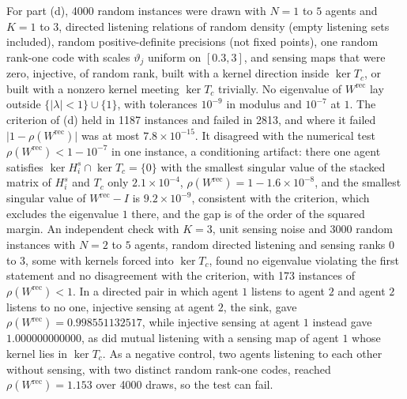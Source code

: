 \begin{numcheck}
For part (d), 4000 random instances were drawn with $N=1$ to $5$ agents and $K=1$ to $3$, directed listening relations of random density (empty listening sets included), random positive-definite precisions (not fixed points), one random rank-one code with scales $\vartheta_j$ uniform on $[0.3,3]$, and sensing maps that were zero, injective, of random rank, built with a kernel direction inside $\ker T_c$, or built with a nonzero kernel meeting $\ker T_c$ trivially. No eigenvalue of $W^{\mathrm{rec}}$ lay outside $\{\lvert\lambda\rvert<1\}\cup\{1\}$, with tolerances $10^{-9}$ in modulus and $10^{-7}$ at $1$. The criterion of (d) held in 1187 instances and failed in 2813, and where it failed $\lvert1-\rho(W^{\mathrm{rec}})\rvert$ was at most $7.8\times10^{-15}$. It disagreed with the numerical test $\rho(W^{\mathrm{rec}})<1-10^{-7}$ in one instance, a conditioning artifact: there one agent satisfies $\ker H^s_i\cap\ker T_c=\{0\}$ with the smallest singular value of the stacked matrix of $H^s_i$ and $T_c$ only $2.1\times10^{-4}$, $\rho(W^{\mathrm{rec}})=1-1.6\times10^{-8}$, and the smallest singular value of $W^{\mathrm{rec}}-I$ is $9.2\times10^{-9}$, consistent with the criterion, which excludes the eigenvalue $1$ there, and the gap is of the order of the squared margin. An independent check with $K=3$, unit sensing noise and 3000 random instances with $N=2$ to $5$ agents, random directed listening and sensing ranks $0$ to $3$, some with kernels forced into $\ker T_c$, found no eigenvalue violating the first statement and no disagreement with the criterion, with 173 instances of $\rho(W^{\mathrm{rec}})<1$. In a directed pair in which agent $1$ listens to agent $2$ and agent $2$ listens to no one, injective sensing at agent $2$, the sink, gave $\rho(W^{\mathrm{rec}})=0.998551132517$, while injective sensing at agent $1$ instead gave $1.000000000000$, as did mutual listening with a sensing map of agent $1$ whose kernel lies in $\ker T_c$. As a negative control, two agents listening to each other without sensing, with two distinct random rank-one codes, reached $\rho(W^{\mathrm{rec}})=1.153$ over 4000 draws, so the test can fail.
\end{numcheck}

